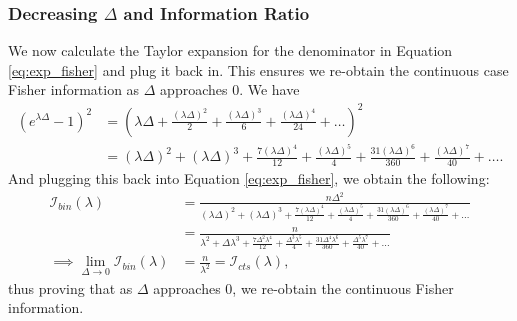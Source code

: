 \documentclass[11pt,a4,twosided,singlespacing,titlepagenumber=on,numbers=endperiod]{scrreprt}
\numberwithin{equation}{chapter} %
\theoremstyle{remark}
\begin{document}
\subsubsection{Decreasing $\Delta$ and Information Ratio}
We now calculate the Taylor expansion for the denominator in Equation \ref{eq:exp_fisher} and plug it back in. This ensures we re-obtain the continuous case Fisher information as $\Delta$ approaches 0. We have
\begin{equation*}
	\begin{aligned}
		(e^{\lambda \Delta} - 1)^2 &= \left( \lambda \Delta + \frac{(\lambda \Delta)^2}{2} + \frac{(\lambda \Delta)^3}{6} + \frac{(\lambda \Delta)^4}{24} + \dots \right)^2 \\
		&= (\lambda \Delta)^2 + (\lambda \Delta)^3 + \frac{7(\lambda \Delta)^4}{12} + \frac{(\lambda \Delta)^5}{4} + \frac{31(\lambda \Delta)^6}{360} + \frac{(\lambda \Delta)^7}{40} + \dots.
	\end{aligned}
\end{equation*}
And plugging this back into Equation \ref{eq:exp_fisher}, we obtain the following:
\begin{equation*}
	\begin{aligned}
		\mathcal{I}_{bin}(\lambda) &= \frac{n\Delta^2}{(\lambda \Delta)^2 + (\lambda \Delta)^3 + \frac{7(\lambda \Delta)^4}{12} + \frac{(\lambda \Delta)^5}{4} + \frac{31(\lambda \Delta)^6}{360} + \frac{(\lambda \Delta)^7}{40} + \dots} \\
		&= \frac{n}{\lambda^2 + \Delta \lambda^3 + \frac{7\Delta^2 \lambda^4}{12} + \frac{\Delta^3 \lambda^5}{4} + \frac{31\Delta^4 \lambda^6}{360} + \frac{\Delta^5 \lambda^7}{40} + \dots} \\
		\implies \lim_{\Delta \to 0} \mathcal{I}_{bin}(\lambda) &= \frac{n}{\lambda^2} = \mathcal{I}_{cts}(\lambda),
	\end{aligned}
\end{equation*}
thus proving that as $\Delta$ approaches 0, we re-obtain the continuous Fisher information.
\end{document}
